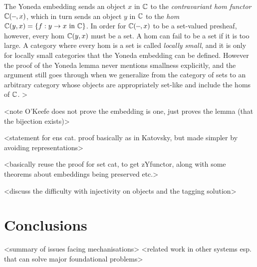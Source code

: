 \documentclass[twoside,titlepage,11pt]{article}
\begin{document}
The Yoneda embedding sends an object $x$ in $\mathbb{C}$ to the \emph{contravariant hom functor} $\C(\blank,x)$, which in turn sends an object $y$ in $\mathbb{C}$ to the \emph{hom} $\mathbb{C}(y,x)=\{f:y\to x\text{ in $\mathbb{C}$}\}$.
In order for $\C(\blank,x)$ to be a set-valued presheaf, however, every hom $\mathbb{C}(y,x)$ must be a set.
A hom can fail to be a set if it is too large.
A category where every hom is a set is called \emph{locally small}, and it is only for locally small categories that the Yoneda embedding can be defined.
However the proof of the Yoneda lemma never mentions smallness explicitly, and the argument still goes through when we generalize from the category of sets to an arbitrary category whose objects are appropriately set-like and include the homs of $\mathbb{C}$.
>

<note O'Keefe does not prove the embedding is one, just proves the lemma (that the bijection exists)>

<statement for ens cat. proof basically as in Katovsky, but made simpler by avoiding representations>

<basically reuse the proof for set cat, to get zYfunctor, along with some theorems about embeddings being preserved etc.>

<discuss the difficulty with injectivity on objects and the tagging solution>
\section{Conclusions}%
<summary of issues facing mechanisations>
<related work in other systems esp. that can solve major foundational problems>


\end{document}
